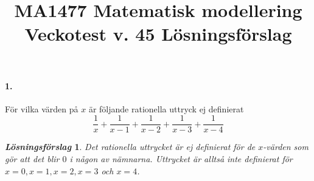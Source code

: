 \documentclass[a4paper]{article}
\title{\bf MA1477 Matematisk modellering \\[10pt]  Veckotest v.
  45 Lösningsförslag}
\date{}
\newtheorem*{sol}{\normalfont\textit{Lösningsförslag}}
\begin{document}
\maketitle

\paragraph{1.} För vilka värden på $x$ är följande rationella uttryck
ej definierat
\[
\dfrac{1}{x} + \dfrac{1}{x-1} + \dfrac{1}{x-2} + \dfrac{1}{x-3} + \dfrac{1}{x-4}
\]
\begin{sol}
  Det rationella uttrycket är ej definierat för de $x$-värden som gör
  att det blir $0$ i någon av nämnarna. Uttrycket är alltså inte
  definierat för $x = 0, x = 1, x= 2, x= 3$ och $x = 4$.
\end{sol}
\end{document}
